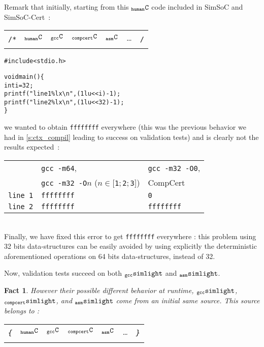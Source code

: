 \documentclass[a4paper, 11pt]{article}
\newenvironment{humC}
  {%
   \begin{alltt}
   \footnotesize}
  {\end{alltt} %
  }
\newcommand{\ccert}{CompCert\xspace}
\newcommand{\yes}{\ding{51}}
\newcommand{\gccSL}{$_{\tt gcc}{\tt simlight}$\xspace}
\newcommand{\cSL}{$_{\tt compcert}{\tt simlight}$\xspace}
\newcommand{\aSL}{$_{\tt asm}{\tt simlight}$\xspace} %
\newcommand{\C}{$_{\tt compcert}{\tt C}$\xspace}
\newcommand{\gccC}{$_{\tt gcc}{\tt C}$\xspace}
\newcommand{\hC}{$_{\tt human}{\tt C}$\xspace}
\newcommand{\aC}{$_{\tt asm}{\tt C}$\xspace}
\newcommand{\simsoc}{SimSoC\xspace}
\newcommand{\SScert}{SimSoC-Cert\xspace}
\newtheorem{fact}{Fact}
\begin{document}
Remark that initially, starting from this \hC code included in \simsoc and \SScert~:
{\newline\tiny
\begin{tabular}{rc|c|c|c|cl}
\multirow{2}{*}{{\footnotesize{\tt /*}}} & \hC  & \gccC  & \C & \aC & \ldots & \multirow{2}{*}{{\footnotesize{\tt */}}} \\
 & \yes & \yes & \yes & \yes & \\
\end{tabular}}
\begin{humC}
#include <stdio.h>

void main() \{
  int i = 32;
  printf("line 1 \%lx\textbackslash{}n", (1lu <<  i) - 1);
  printf("line 2 \%lx\textbackslash{}n", (1lu << 32) - 1);
\}
\end{humC}
we wanted to obtain \verb|ffffffff| everywhere (this was the previous behavior we had in \ref{s:ctx_compil} leading to success on validation tests) and is clearly not the results expected~:\\
\begin{tabular}{l|l|l}
& \verb|gcc -m64|, & \verb|gcc -m32 -O0|, \\
& \verb|gcc -m32 -O|$n$ ($n\in[$\verb|1|$; $\verb|2|$; $\verb|3|$]$)& \ccert \\
\hline
\verb|line 1| & \verb|ffffffff| & \verb|0| \\
\verb|line 2| & \verb|ffffffff| & \verb|ffffffff| \\
\end{tabular} \\

Finally, we have fixed this error to get \verb|ffffffff| everywhere : this problem using 32 bits data-structures can be easily avoided by using explicitly the deterministic aforementioned operations on 64 bits data-structures, instead of 32.

Now, validation tests succeed on both \gccSL and \aSL.

\begin{fact}
However their possible different behavior at runtime, \gccSL, \cSL, and \aSL come from an initial same source. This source belongs to :
{\newline\small
\begin{tabular}{rc|c|c|c|cl}
\multirow{2}{*}{{\LARGE{\tt \{}}} & \hC  & \gccC  & \C & \aC & \ldots & \multirow{2}{*}{{\LARGE{\tt \}}}} \\
 & \yes & \yes & \yes & \yes & \\
\end{tabular} }
\end{fact}
\end{document}
